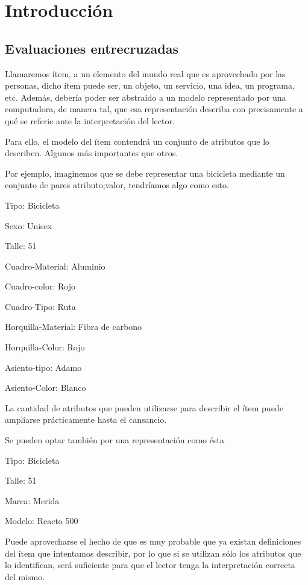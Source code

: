 \chapter{Introducción}
\label{chapter:introduccion}

\section{Evaluaciones entrecruzadas}
\label{section:evaluaciones-cruzadas}
Llamaremos ítem, a un elemento del mundo real que es aprovechado por las personas, dicho ítem puede ser, un objeto, un servicio, una idea, un programa, etc. Además, debería poder ser abstraído a un modelo representado por una computadora, de manera tal, que esa representación describa con precisamente a qué se referie ante la interpretación del lector. 

Para ello, el modelo del ítem contendrá un conjunto de atributos que lo describen. Algunos más importantes que otros.

Por ejemplo, imaginemos que se debe representar una bicicleta mediante un conjunto de pares atributo;valor, tendríamos algo como esto.

Tipo: Bicicleta

Sexo: Unisex

Talle: 51

Cuadro-Material: Aluminio

Cuadro-color: Rojo

Cuadro-Tipo: Ruta

Horquilla-Material: Fibra de carbono

Horquilla-Color: Rojo

Asiento-tipo: Adamo 

Asiento-Color: Blanco

La cantidad de atributos que pueden utilizarse para describir el ítem puede ampliarse prácticamente hasta el cansancio. 

Se pueden optar también por una representación como ésta

Tipo: Bicicleta

Talle: 51 

Marca: Merida

Modelo: Reacto 500

Puede aprovecharse el hecho de que es muy probable que ya existan definiciones del ítem que intentamos describir, por lo que si se utilizan sólo los atributos que lo identifican, será suficiente para que el lector tenga la interpretación correcta del mismo. 

